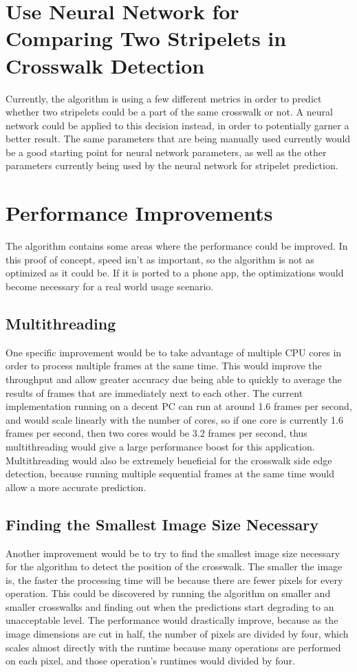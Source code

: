 \documentclass[12pt]{ucthesis}
\begin{document}
\section{Use Neural Network for Comparing Two Stripelets in Crosswalk Detection}

Currently, the algorithm is using a few different metrics in order to predict whether two stripelets could be a part of the same crosswalk or not. A neural network could be applied to this decision instead, in order to potentially garner a better result. The same parameters that are being manually used currently would be a good starting point for neural network parameters, as well as the other parameters currently being used by the neural network for stripelet prediction. 

\section{Performance Improvements}

The algorithm contains some areas where the performance could be improved. In this proof of concept, speed isn't as important, so the algorithm is not as optimized as it could be. If it is ported to a phone app, the optimizations would become necessary for a real world usage scenario.

\subsection{Multithreading}
One specific improvement would be to take advantage of multiple CPU cores in order to process multiple frames at the same time. This would improve the throughput and allow greater accuracy due being able to quickly to average the results of frames that are immediately next to each other.
The current implementation running on a decent PC can run at around 1.6 frames per second, and would scale linearly with the number of cores, so if one core is currently 1.6 frames per second, then two cores would be 3.2 frames per second, thus multithreading would give a large performance boost for this application. Multithreading would also be extremely beneficial for the crosswalk side edge detection, because running multiple sequential frames at the same time would allow a more accurate prediction.

\subsection{Finding the Smallest Image Size Necessary}
Another improvement would be to try to find the smallest image size necessary for the algorithm to detect the position of the crosswalk. The smaller the image is, the faster the processing time will be because there are fewer pixels for every operation. This could be discovered by running the algorithm on smaller and smaller crosswalks and finding out when the predictions start degrading to an unacceptable level. The performance would drastically improve, because as the image dimensions are cut in half, the number of pixels are divided by four, which scales almost directly with the runtime because many operations are performed on each pixel, and those operation's runtimes would divided by four. 
\end{document}
